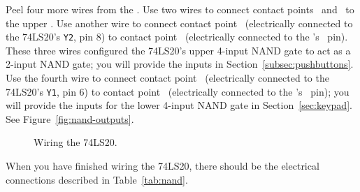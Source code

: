 Peel four more wires from the \rainbow.
Use two wires to connect contact points \nandupperc\ and \nandupperd\ to the upper \power.
Use another wire to connect contact point \nanduppery\ (electrically connected to the 74LS20's \texttt{Y2}, pin 8) to contact point \mcubuttonnandpoint\ (electrically connected to the \developmentboard's \mcubuttonnand\ pin).
These three wires configured the 74LS20's upper 4-input NAND gate to act as a 2-input NAND gate;
you will provide the inputs in Section~\ref{subsec:pushbuttons}.
Use the fourth wire to connect contact point \nandlowery\ (electrically connected to the 74LS20's \texttt{Y1}, pin 6) to contact point \mcukeypadnandpoint\ (electrically connected to the \developmentboard's \mcukeypadnand\ pin);
you will  provide the inputs for the lower 4-input NAND gate in Section~\ref{sec:keypad}.
See Figure~\ref{fig:nand-outputs}.

\begin{figure}
    \centering
    \hfil
    \caption{Wiring the 74LS20.}
\end{figure}

When you have finished wiring the 74LS20, there should be the electrical connections described in Table~\ref{tab:nand}.

